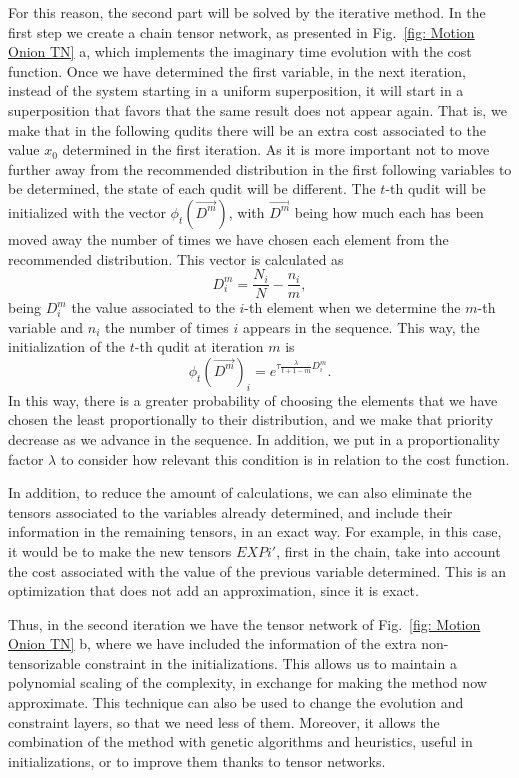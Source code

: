 For this reason, the second part will be solved by the iterative method. In the first step we create a chain tensor network, as presented in Fig.~\ref{fig: Motion Onion TN} a, which implements the imaginary time evolution with the cost function. Once we have determined the first variable, in the next iteration, instead of the system starting in a uniform superposition, it will start in a superposition that favors that the same result does not appear again. That is, we make that in the following qudits there will be an extra cost associated to the value $x_0$ determined in the first iteration. As it is more important not to move further away from the recommended distribution in the first following variables to be determined, the state of each qudit will be different. The $t$-th qudit will be initialized with the vector $\phi_t(\vec{D^m})$, with $\vec{D^m}$ being how much each has been moved away the number of times we have chosen each element from the recommended distribution. This vector is calculated as
\begin{equation}
    D^m_i=\frac{N_i}{N} - \frac{n_i}{m},
\end{equation}
being $D^m_i$ the value associated to the $i$-th element when we determine the $m$-th variable and $n_i$ the number of times $i$ appears in the sequence. This way, the initialization of the $t$-th qudit at iteration $m$ is
\begin{equation}
    \phi_t(\vec{D^m})_i = e^{\tau \frac{\lambda}{t+1-m}D^{m}_i}.
\end{equation}
In this way, there is a greater probability of choosing the elements that we have chosen the least proportionally to their distribution, and we make that priority decrease as we advance in the sequence. In addition, we put in a proportionality factor $\lambda$ to consider how relevant this condition is in relation to the cost function.

In addition, to reduce the amount of calculations, we can also eliminate the tensors associated to the variables already determined, and include their information in the remaining tensors, in an exact way. For example, in this case, it would be to make the new tensors $EXPi'$, first in the chain, take into account the cost associated with the value of the previous variable determined. This is an optimization that does not add an approximation, since it is exact.

Thus, in the second iteration we have the tensor network of Fig.~\ref{fig: Motion Onion TN} b, where we have included the information of the extra non-tensorizable constraint in the initializations. This allows us to maintain a polynomial scaling of the complexity, in exchange for making the method now approximate. This technique can also be used to change the evolution and constraint layers, so that we need less of them. Moreover, it allows the combination of the method with genetic algorithms and heuristics, useful in initializations, or to improve them thanks to tensor networks.


